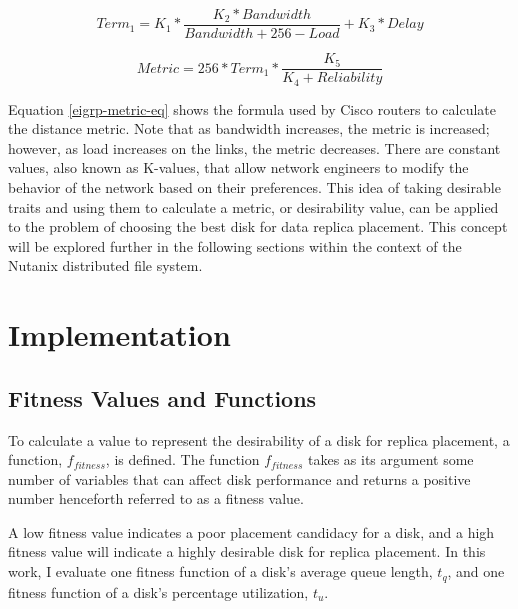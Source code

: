 \documentclass[12pt]{article}
\begin{document}
\newpage

  \begin{equation}
    Term_{1} = K_{1} * \frac{K_{2} * Bandwidth}{Bandwidth + 256 - Load} + K_{3} * Delay
  \end{equation}

  \begin{equation} \label{eigrp-metric-eq}
    Metric = 256 * Term_{1} * \frac{K_{5}}{K_{4} + Reliability}
  \end{equation}

  Equation \ref{eigrp-metric-eq} shows the formula used by Cisco routers to
  calculate the distance metric. Note that as bandwidth increases, the metric
  is increased; however, as load increases on the links, the metric decreases.
  There are constant values, also known as K-values, that allow network
  engineers to modify the behavior of the network based on their preferences.
  This idea of taking desirable traits and using them to calculate a metric, or
  desirability value, can be applied to the problem of choosing the best disk
  for data replica placement. This concept will be explored further in the
  following sections within the context of the Nutanix distributed file system.


\newpage
\FloatBarrier
\section{Implementation}

  \subsection{Fitness Values and Functions} \label{section-fitness}

  To calculate a value to represent the desirability of a disk for replica
  placement, a function, $f_{fitness}$, is defined. The function $f_{fitness}$
  takes as its argument some number of variables that can affect disk
  performance and returns a positive number henceforth referred to as a fitness
  value.
  
  A low fitness value indicates a poor placement candidacy for a disk, and a
  high fitness value will indicate a highly desirable disk for replica
  placement. In this work, I evaluate one fitness function of a disk's average
  queue length, $t_{q}$, and one fitness function of
  a disk's percentage utilization, $t_{u}$.
\end{document}
